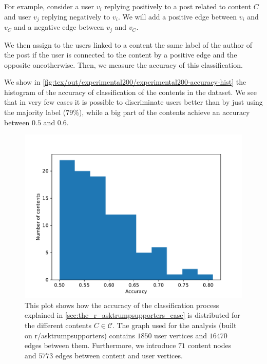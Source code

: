 For example, consider a user $v_i$
replying positively to a post related to content $C$ and user $v_j$ replying
negatively to $v_i$. We will add a positive edge between $v_i$ and $v_C$ and a
negative edge between $v_j$ and $v_C$.

We then assign to the users linked to a content the same label of the author of
the post if the user is connected to the content
by a positive edge and the opposite one\footnotemark otherwise. Then, we measure the accuracy of
this classification.


We show in \autoref{fig:tex/out/experimental200/experimental200-accuracy-hist}
the histogram of the accuracy of classification of the contents in the dataset.
We see that in very few cases it is possible to discriminate users better than
by just using the majority label ($79\%$), while a big part of the contents
achieve an accuracy between $0.5$ and $0.6$.

\begin{figure}
	\centering
	\includegraphics[width=0.6\linewidth]{tex/out/experimental200/experimental200-accuracy-hist.pdf}
	\caption[Distribution of accuracy of classification of r/asktrumpsupporters users for the
		different contents]{This plot shows how the accuracy of the classification
		process explained in \autoref{sec:the_r_asktrumpsupporters_case} is
		distributed for the different contents $C \in \mathcal{C} $. The graph
		used for the analysis (built on r/asktrumpsupporters) contains $1850$ user vertices and
		$16470$ edges between them. Furthermore, we introduce
		$71$ content nodes and $5773$ edges between content and user
		vertices.}%
	\label{fig:tex/out/experimental200/experimental200-accuracy-hist}
\end{figure}

